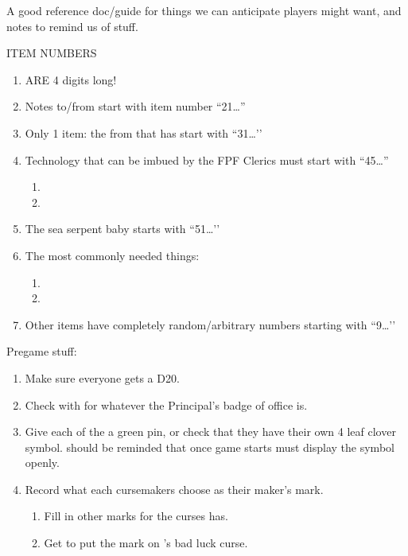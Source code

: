\documentclass[green]{GL2020}
\begin{document}
\name{\gGMGuide{}}

A good reference doc/guide for things we can anticipate players might want, and notes to remind us of stuff.

{\large ITEM NUMBERS}
\begin{enumerate}
	\item ARE 4 digits long!
	\item Notes to/from \cChupInventor{} start with item number ``21\ldots ''
	\item Only 1 item: the \iFolderOfNotes{} from \cBunker{} that \cDisney{} has start with ``31\ldots ’’
	\item Technology that can be imbued by the FPF Clerics must start with ``45\ldots ''
	\begin{enumerate}
		\item \iMagicMusicBox{}
		\item \iVidCom{}
	\end{enumerate}
	\item The sea serpent baby starts with ``51…’’
	\item The most commonly needed things:
	\begin{enumerate}
		\item \iRitualCandle{}
		\item \iGlassVial{}
	\end{enumerate}
	\item Other items have completely random/arbitrary numbers starting with ``9\ldots ’’
\end{enumerate}

{\large Pregame stuff:}
\begin{enumerate}
	\item Make sure everyone gets a D20.
	\item Check with \cPrincipal{\MYplayer} for whatever the Principal's badge of office is.
	\item Give each of the \pGoaties{} a green pin, or check that they have their own 4 leaf clover symbol. \cChupAvenger{\MYplayer} should be reminded that once game starts \cChupAvenger{\they} must display the symbol openly.
	\item Record what each cursemakers choose as their maker’s mark.
	\begin{enumerate}
		\item Fill in other marks for the curses \cHedonist{\MYplayer} has.
		\item Get \cPrince{\MYplayer} to put the mark on \cInitiate{\MYplayer}’s bad luck curse.
	\end{enumerate}
\end{enumerate}
\end{document}
